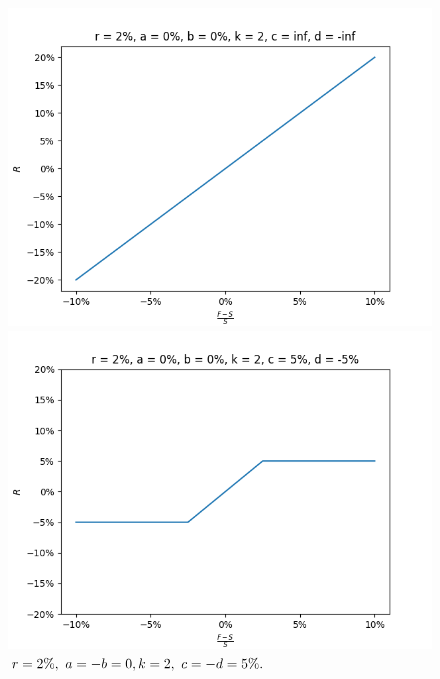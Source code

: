 \documentclass[10pt]{article}
\begin{document}
\begin{figure}[!htb]
  \includegraphics[width=\linewidth]{./plots/r_0.02_a_0_b_0_c_inf_d_-inf_k_2.png}
   \caption{$\\r=2\%,\ a=-b=0,\\ k=2,\ c=-d=0.$}\label{fig:clamp1}
\endminipage\hfill
{}
  \includegraphics[width=\linewidth]{./plots/r_0.02_a_0_b_0_c_0.05_d_-0.05_k_2.png}
  \caption{$\\r=2\%,\ a=-b=0,\\ k=2,\ c=-d=5\%.$}\label{fig:clamp22}
\endminipage\hfill
{}%

\end{figure}
\end{document}

